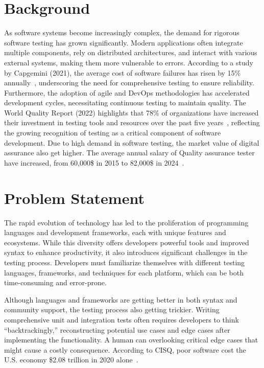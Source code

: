 \section{Background}
As software systems become increasingly complex, the demand for rigorous software testing has grown significantly. Modern applications often integrate multiple components, rely on distributed architectures, and interact with various external systems, making them more vulnerable to errors. According to a study by Capgemini (2021), the average cost of software failures has risen by 15\% annually~\cite{WQR2122}, underscoring the need for comprehensive testing to ensure reliability. Furthermore, the adoption of agile and DevOps methodologies has accelerated development cycles, necessitating continuous testing to maintain quality. The World Quality Report (2022) highlights that 78\% of organizations have increased their investment in testing tools and resources over the past five years~\cite{WQR2122}, reflecting the growing recognition of testing as a critical component of software development. Due to high demand in software testing, the market value of digital assurance also get higher. The average annual salary of Quality assurance tester have increased, from 60,000\$ in 2015 to 82,000\$ in 2024~\cite{QASalaries}.

\section{Problem Statement}

\hspace{0.5cm} The rapid evolution of technology has led to the proliferation of programming languages and development frameworks, each with unique features and ecosystems. While this diversity offers developers powerful tools and improved syntax to enhance productivity, it also introduces significant challenges in the testing process. Developers must familiarize themselves with different testing languages, frameworks, and techniques for each platform, which can be both time-consuming and error-prone.

\hspace{0.2cm} Although languages and frameworks are getting better in both syntax and community support, the testing process also getting trickier. Writing comprehensive unit and integration tests often requires developers to think “backtrackingly,” reconstructing potential use cases and edge cases after implementing the functionality. A human can overlooking critical edge cases that might cause a costly consequence. According to CISQ, poor software cost the U.S. economy \$2.08 trillion in 2020 alone~\cite{CostPoorSoftware}.

